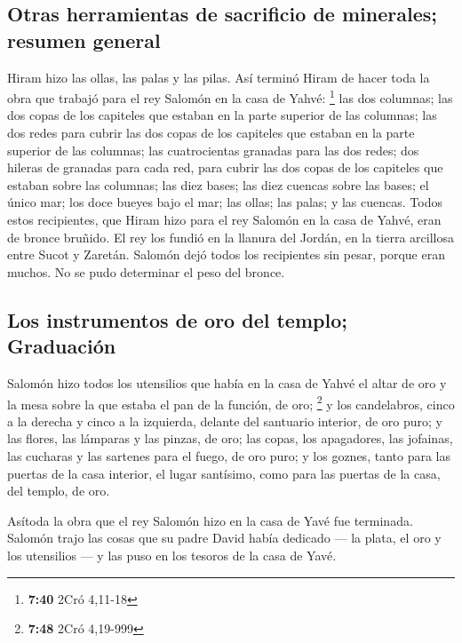 \begin{paracol}{2}
{\subsection{Otras herramientas de sacrificio de minerales; resumen
general}\label{otras-herramientas-de-sacrificio-de-minerales-resumen-general}}

 Hiram hizo las ollas, las palas y las pilas. Así terminó
Hiram de hacer toda la obra que trabajó para el rey Salomón en la casa
de Yahvé: \footnote{\textbf{7:40} 2Cró 4,11-18}  las dos
columnas; las dos copas de los capiteles que estaban en la parte
superior de las columnas; las dos redes para cubrir las dos copas de los
capiteles que estaban en la parte superior de las columnas;
 las cuatrocientas granadas para las dos redes; dos
hileras de granadas para cada red, para cubrir las dos copas de los
capiteles que estaban sobre las columnas;  las diez
bases; las diez cuencas sobre las bases;  el único mar;
los doce bueyes bajo el mar;  las ollas; las palas; y las
cuencas. Todos estos recipientes, que Hiram hizo para el rey Salomón en
la casa de Yahvé, eran de bronce bruñido.  El rey los
fundió en la llanura del Jordán, en la tierra arcillosa entre Sucot y
Zaretán.  Salomón dejó todos los recipientes sin pesar,
porque eran muchos. No se pudo determinar el peso del bronce.

\hypertarget{los-instrumentos-de-oro-del-templo-graduaciuxf3n}{%
\subsection{Los instrumentos de oro del templo;
Graduación}\label{los-instrumentos-de-oro-del-templo-graduaciuxf3n}}

 Salomón hizo todos los utensilios que había en la casa
de Yahvé el altar de oro y la mesa sobre la que estaba el pan de la
función, de oro; \footnote{\textbf{7:48} 2Cró 4,19-999} 
y los candelabros, cinco a la derecha y cinco a la izquierda, delante
del santuario interior, de oro puro; y las flores, las lámparas y las
pinzas, de oro;  las copas, los apagadores, las jofainas,
las cucharas y las sartenes para el fuego, de oro puro; y los goznes,
tanto para las puertas de la casa interior, el lugar santísimo, como
para las puertas de la casa, del templo, de oro.

 Asítoda la obra que el rey Salomón hizo en la casa de
Yavé fue terminada. Salomón trajo las cosas que su padre David había
dedicado --- la plata, el oro y los utensilios --- y las puso en los
tesoros de la casa de Yavé.


\end{paracol}
